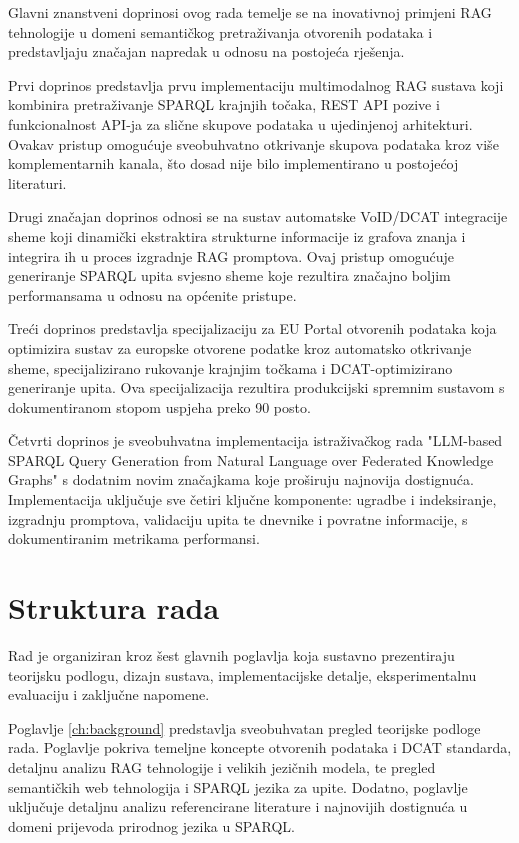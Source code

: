 Glavni znanstveni doprinosi ovog rada temelje se na inovativnoj primjeni RAG tehnologije u domeni semantičkog pretraživanja otvorenih podataka i predstavljaju značajan napredak u odnosu na postojeća rješenja.

Prvi doprinos predstavlja prvu implementaciju multimodalnog RAG sustava koji kombinira pretraživanje SPARQL krajnjih točaka, REST API pozive i funkcionalnost API-ja za slične skupove podataka u ujedinjenoj arhitekturi. Ovakav pristup omogućuje sveobuhvatno otkrivanje skupova podataka kroz više komplementarnih kanala, što dosad nije bilo implementirano u postojećoj literaturi.

Drugi značajan doprinos odnosi se na sustav automatske VoID/DCAT integracije sheme koji dinamički ekstraktira strukturne informacije iz grafova znanja i integrira ih u proces izgradnje RAG promptova. Ovaj pristup omogućuje generiranje SPARQL upita svjesno sheme koje rezultira značajno boljim performansama u odnosu na općenite pristupe.

Treći doprinos predstavlja specijalizaciju za EU Portal otvorenih podataka koja optimizira sustav za europske otvorene podatke kroz automatsko otkrivanje sheme, specijalizirano rukovanje krajnjim točkama i DCAT-optimizirano generiranje upita. Ova specijalizacija rezultira produkcijski spremnim sustavom s dokumentiranom stopom uspjeha preko 90 posto.

Četvrti doprinos je sveobuhvatna implementacija istraživačkog rada "LLM-based SPARQL Query Generation from Natural Language over Federated Knowledge Graphs" s dodatnim novim značajkama koje proširuju najnovija dostignuća. Implementacija uključuje sve četiri ključne komponente: ugradbe i indeksiranje, izgradnju promptova, validaciju upita te dnevnike i povratne informacije, s dokumentiranim metrikama performansi.

\section{Struktura rada}
\label{sec:structure}

Rad je organiziran kroz šest glavnih poglavlja koja sustavno prezentiraju teorijsku podlogu, dizajn sustava, implementacijske detalje, eksperimentalnu evaluaciju i zaključne napomene.

Poglavlje \ref{ch:background} predstavlja sveobuhvatan pregled teorijske podloge rada. Poglavlje pokriva temeljne koncepte otvorenih podataka i DCAT standarda, detaljnu analizu RAG tehnologije i velikih jezičnih modela, te pregled semantičkih web tehnologija i SPARQL jezika za upite. Dodatno, poglavlje uključuje detaljnu analizu referencirane literature i najnovijih dostignuća u domeni prijevoda prirodnog jezika u SPARQL.

